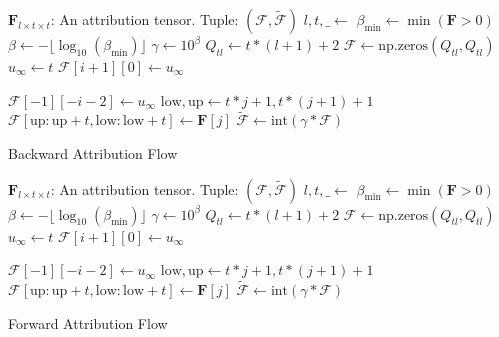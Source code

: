 \documentclass{article} %
\theoremstyle{bfnote}
\begin{document}
\begin{minipage}{0.45\textwidth}
\begin{algorithm}[H]
	\footnotesize
\begin{algorithmic}[0]
	\Require $\bm{F}_{l\times t \times t}$: An attribution tensor.
	\Ensure Tuple: $(\mathcal{F}, \widetilde{\mathcal{F}})$
	\State $l, t, \text{$\_$} \gets$ 
	\State $\text{$\beta_{\min}$} \gets \min(\bm{F}>0)$
	\State $\text{$\beta$} \gets -\lfloor \log_{10}(\text{$\beta_{\min}$}) \rfloor$
	\State $\gamma \gets 10^\beta$
	\State $Q_{tl} \gets t \ast (l + 1) + 2$
	\State $\mathcal{\mathcal{F}} \gets \text{np.zeros} (Q_{tl}, Q_{tl})$
	\State $u_{\infty} \gets t$
	\State $\mathcal{F}[i+1][0] \gets u_{\infty}$
	\EndFor
	
	\State $\mathcal{F}[-1][-i-2] \gets u_{\infty}$
	\EndFor
	\State $\text{low}, \text{up} \gets t \ast j + 1, t \ast (j + 1) + 1$
	\State $\mathcal{F}[\text{up} : \text{up}+t, \text{low} : \text{low}+t] \gets \bm{F}[j]$
	\EndFor
	\State $\widetilde{\mathcal{F}} \gets\text{int}(\gamma \ast \mathcal{F})$
	\EndFunction
\end{algorithmic}
\caption{Backward Attribution Flow}\label{algo:1}
\end{algorithm}
\end{minipage}
\hfill
\begin{minipage}{0.45\textwidth}
	\begin{algorithm}[H]
		\footnotesize
		\begin{algorithmic}[0]
			\Require $\bm{F}_{l\times t \times t}$: An attribution tensor.
			\Ensure Tuple: $(\mathcal{F}, \widetilde{\mathcal{F}})$
			\State $l, t, \text{$\_$} \gets$ 
			\State $\text{$\beta_{\min}$} \gets \min(\bm{F}>0)$
			\State $\text{$\beta$} \gets -\lfloor \log_{10}(\text{$\beta_{\min}$}) \rfloor$
			\State $\gamma \gets 10^\beta$
			\State $Q_{tl} \gets t \ast (l + 1) + 2$
			\State $\mathcal{\mathcal{F}} \gets \text{np.zeros} (Q_{tl}, Q_{tl})$
			\State $u_{\infty} \gets t$
			\State $\mathcal{F}[i+1][0] \gets u_{\infty}$
			\EndFor
			
			\State $\mathcal{F}[-1][-i-2] \gets u_{\infty}$
			\EndFor
			\State $\text{low}, \text{up} \gets t \ast j + 1, t \ast (j + 1) + 1$
			\State $\mathcal{F}[\text{up} : \text{up}+t, \text{low} : \text{low}+t] \gets \bm{F}[j]$
			\EndFor
			\State $\widetilde{\mathcal{F}} \gets\text{int}(\gamma \ast \mathcal{F})$
			\EndFunction
		\end{algorithmic}
		\caption{Forward Attribution Flow}\label{algo:2}
	\end{algorithm}
\end{minipage}
\end{document}

